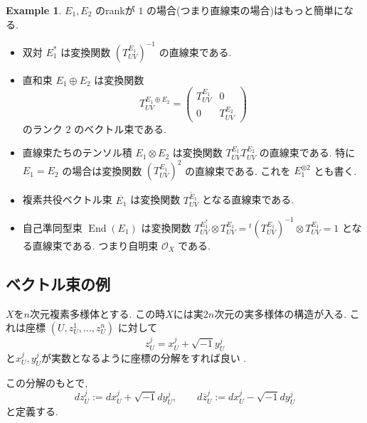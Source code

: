 \documentclass[dvipdfmx,a4paper,11pt]{article} %
\theoremstyle{definition}
\newtheorem{ex}[thm]{Example}
\theoremstyle{remark}
\numberwithin{equation}{section}
\newcommand{\End}[0]{\operatorname{End}}
\begin{document}
\begin{ex}
\(E_1, E_2\) のrankが \(1\) の場合(つまり直線束の場合)はもっと簡単になる.
\begin{itemize}
\item 双対 \(E_1^*\) は変換関数 \((T^{E_1}_{UV})^{-1}\) の直線束である.
\item 直和束 \(E_1\oplus E_2\) は変換関数
\[
T^{E_1\oplus E_2}_{UV}=
\begin{pmatrix}
T^{E_1}_{UV} & 0\\
0 & T^{E_2}_{UV}
\end{pmatrix}
\]
のランク \(2\) のベクトル束である.
\item 直線束たちのテンソル積 \(E_1 \otimes E_2\) は変換関数 \(T^{E_1}_{UV}T^{E_2}_{UV}\) の直線束である. 特に \(E_1=E_2\) の場合は変換関数 \((T^{E_1}_{UV})^2\) の直線束である. これを \(E_1^{\otimes 2}\) とも書く.
\item 複素共役ベクトル束 \(\overline{E_1}\) は変換関数 \(\overline{T^{E_1}_{UV}}\) となる直線束である.
\item 自己準同型束
\(\End(E_1)\) は変換関数 \(T^{E_1^*}_{UV}\otimes T^{E_1}_{UV}={}^t(T^{E_1}_{UV})^{-1}\otimes T^{E_1}_{UV}=1\) となる直線束である. つまり自明束 \(\mathcal{O}_{X}\) である.
\end{itemize}
\end{ex}



\subsection{ベクトル束の例}

$X$を$n$次元複素多様体とする. この時$X$には実$2n$次元の実多様体の構造が入る. 
これは座標 \((U,z_U^1,\ldots,z_U^n)\) に対して
\[
z_U^j=x_U^j+\sqrt{-1}y_U^j
\]
と$x_U^j, y_U^j$が実数となるように座標の分解をすれば良い .

この分解のもとで, 
\[
dz_U^j:=dx_U^j+\sqrt{-1}dy_U^j,\qquad d\overline{z}_U^j:=dx_U^j-\sqrt{-1}dy_U^j
\]
と定義する. 
\end{document}
